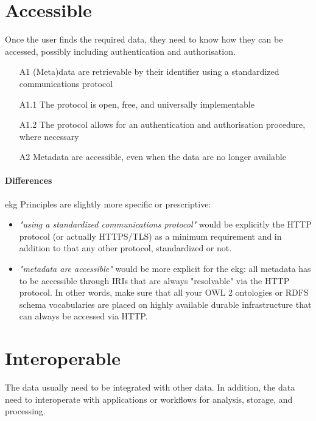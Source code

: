 \section{Accessible}

Once the user finds the required data, they need to know how they can be accessed,
possibly including authentication and authorisation.

\begin{itemize}
    \item[A1] (Meta)data are retrievable by their identifier using a standardized communications protocol
    \item[A1.1] The protocol is open, free, and universally implementable
    \item[A1.2] The protocol allows for an authentication and authorisation procedure, where necessary
    \item[A2] Metadata are accessible, even when the data are no longer available
\end{itemize}

\paragraph{Differences}

\gls{ekg} Principles are slightly more specific or prescriptive:

\begin{itemize}
    \item \textit{"using a standardized communications protocol"} would be explicitly the HTTP protocol
          (or actually HTTPS/TLS) as a minimum requirement and in addition to that any other protocol,
          standardized or not.
    \item \textit{"metadata are accessible"} would be more explicit for the \gls{ekg}:
          all metadata has to be accessible through IRIs that are always "resolvable" via the HTTP protocol.
          In other words, make sure that all your OWL 2 ontologies or RDFS schema vocabularies are placed on
          highly available durable infrastructure that can always be accessed via HTTP.
\end{itemize}

\section{Interoperable}

The data usually need to be integrated with other data.
In addition, the data need to interoperate with applications or workflows for analysis, storage, and processing.

